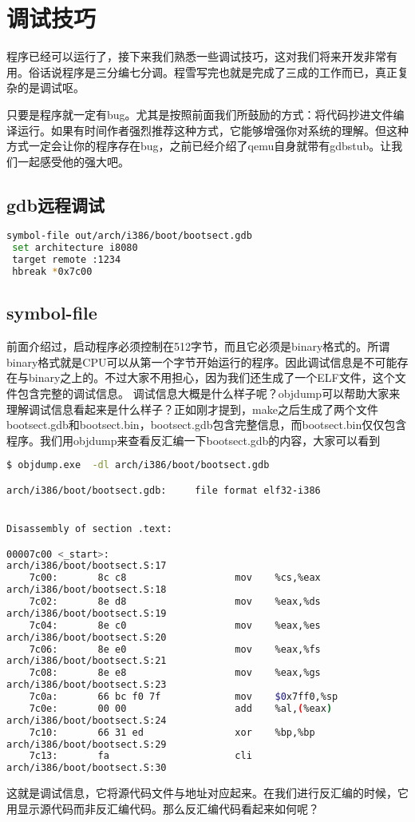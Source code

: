 \section{调试技巧}

程序已经可以运行了，接下来我们熟悉一些调试技巧，这对我们将来开发非常有用。俗话说程序是三分编七分调。程雪写完也就是完成了三成的工作而已，真正复杂的是调试呕。

只要是程序就一定有bug。尤其是按照前面我们所鼓励的方式：将代码抄进文件编译运行。如果有时间作者强烈推荐这种方式，它能够增强你对系统的理解。但这种方式一定会让你的程序存在bug，之前已经介绍了qemu自身就带有gdbstub。让我们一起感受他的强大吧。
\subsection{gdb远程调试}
\begin{lstlisting}[language=bash]
 symbol-file out/arch/i386/boot/bootsect.gdb
 set architecture i8080
 target remote :1234
 hbreak *0x7c00
\end{lstlisting}

\subsection{symbol-file}
前面介绍过，启动程序必须控制在512字节，而且它必须是binary格式的。所谓binary格式就是CPU可以从第一个字节开始运行的程序。因此调试信息是不可能存在与binary之上的。不过大家不用担心，因为我们还生成了一个ELF文件，这个文件包含完整的调试信息。
调试信息大概是什么样子呢？objdump可以帮助大家来理解调试信息看起来是什么样子？正如刚才提到，make之后生成了两个文件bootsect.gdb和bootsect.bin，bootsect.gdb包含完整信息，而bootsect.bin仅仅包含程序。我们用objdump来查看反汇编一下bootsect.gdb的内容，大家可以看到
\begin{lstlisting}[language=bash]
$ objdump.exe  -dl arch/i386/boot/bootsect.gdb

arch/i386/boot/bootsect.gdb:     file format elf32-i386


Disassembly of section .text:

00007c00 <_start>:
arch/i386/boot/bootsect.S:17
    7c00:       8c c8                   mov    %cs,%eax
arch/i386/boot/bootsect.S:18
    7c02:       8e d8                   mov    %eax,%ds
arch/i386/boot/bootsect.S:19
    7c04:       8e c0                   mov    %eax,%es
arch/i386/boot/bootsect.S:20
    7c06:       8e e0                   mov    %eax,%fs
arch/i386/boot/bootsect.S:21
    7c08:       8e e8                   mov    %eax,%gs
arch/i386/boot/bootsect.S:23
    7c0a:       66 bc f0 7f             mov    $0x7ff0,%sp
    7c0e:       00 00                   add    %al,(%eax)
arch/i386/boot/bootsect.S:24
    7c10:       66 31 ed                xor    %bp,%bp
arch/i386/boot/bootsect.S:29
    7c13:       fa                      cli
arch/i386/boot/bootsect.S:30
\end{lstlisting}
这就是调试信息，它将源代码文件与地址对应起来。在我们进行反汇编的时候，它用显示源代码而非反汇编代码。那么反汇编代码看起来如何呢？

